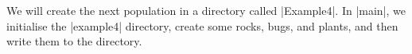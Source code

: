 We will create the next population in a directory called |Example4|.
In |main|, we initialise the |example4| directory, create some rocks,
bugs, and plants, and then write them to the directory.


